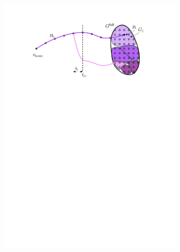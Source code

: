 \documentclass[conference]{IEEEtran}
\begin{document}
\begin{figure}[t]
\begin{subfigure}{0.225\textwidth}
        \includegraphics[width=\textwidth]{3_preprocess_loop_6}
        \caption{}
        \label{fig:pl6}
    \end{subfigure}
    \hspace{1mm}
    \begin{subfigure}{0.225\textwidth}

\end{subfigure}
\end{figure}
\end{document}
